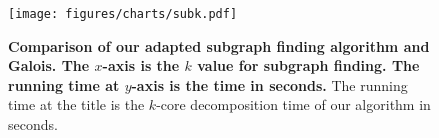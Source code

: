 \begin{figure}[t]
  \centering
  \texttt{[image: figures/charts/subk.pdf]}
  \caption{\textbf{Comparison of our adapted subgraph finding algorithm and Galois. 
  The $x$-axis is the $k$ value for subgraph finding.
  The running time at $y$-axis is the time in seconds.}
  The running time at the title is the $k$-core decomposition time of our algorithm in seconds.}\label{fig:subk}
\end{figure}
